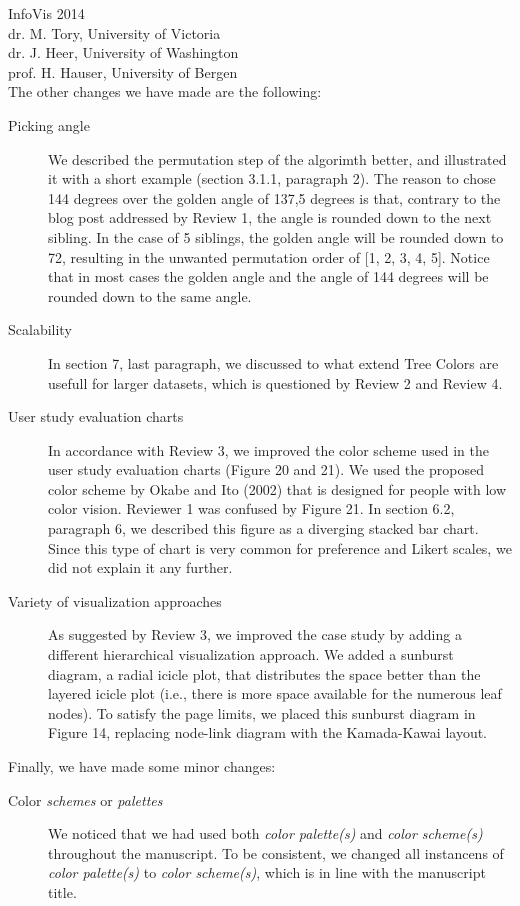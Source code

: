 \documentclass{letter}
\begin{document}
\begin{letter}{InfoVis 2014 \\ dr. M. Tory, University of Victoria \\ dr. J. Heer, University of Washington \\ prof. H. Hauser, University of Bergen}
\newpage
{} \\

The other changes we have made are the following:

\begin{description}
\item[Picking angle] We described the permutation step of the algorimth better, and illustrated it with a short example (section 3.1.1, paragraph 2). The reason to chose 144 degrees over the golden angle of 137,5 degrees is that, contrary to the blog post addressed by Review 1, the angle is rounded down to the next sibling. In the case of 5 siblings, the golden angle will be rounded down to 72, resulting in the unwanted permutation order of [1, 2, 3, 4, 5]. Notice that in most cases the golden angle and the angle of 144 degrees will be rounded down to the same angle.
\item[Scalability] In section 7, last paragraph, we discussed to what extend Tree Colors are usefull for larger datasets, which is questioned by Review 2 and Review 4.
\item[User study evaluation charts] In accordance with Review 3, we improved the color scheme used in the user study evaluation charts (Figure 20 and 21). We used the proposed color scheme by Okabe and Ito (2002) that is designed for people with low color vision. Reviewer 1 was confused by Figure 21. In section 6.2, paragraph 6, we described this figure as a diverging stacked bar chart. Since this type of chart is very common for preference and Likert scales, we did not explain it any further.
\item[Variety of visualization approaches] As suggested by Review 3, we improved the case study by adding a different hierarchical visualization approach. We added a sunburst diagram, a radial icicle plot, that distributes the space better than the layered icicle plot (i.e., there is more space available for the numerous leaf nodes). To satisfy the page limits, we placed this sunburst diagram in Figure 14, replacing node-link diagram with the Kamada-Kawai layout.
\end{description}

Finally, we have made some minor changes:
\begin{description}
\item[Color \textit{schemes} or \textit{palettes}] We noticed that we had used both \textit{color palette(s)} and \textit{color scheme(s)} throughout the manuscript. To be consistent, we changed all instancens of \textit{color palette(s)} to \textit{color scheme(s)}, which is in line with the manuscript title.
\end{description}








\end{letter}
\end{document}
